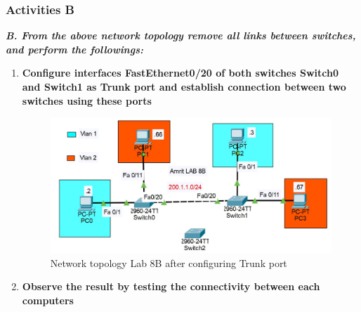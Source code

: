 \documentclass[a4paper,11pt]{article}
\begin{document}
\subsubsection{Activities B}

{\bfseries \textit{B. From the above network topology remove all links between switches, and perform the
        followings:}}



\begin{enumerate}

    \item\textbf{ Configure interfaces FastEthernet0/20 of both switches Switch0 and Switch1 as Trunk
              port and establish connection between two switches using these ports}



          \begin{figure}[H]
              \centering
              \includegraphics[scale=0.67,cframe=blue 0.5pt 3pt]{./FIG/Lab8B1.jpg}
              \caption{Network topology Lab 8B after configuring Trunk port }
          \end{figure}






    \item\textbf{  Observe the result by testing the connectivity between each computers}


\end{enumerate}
\end{document}
